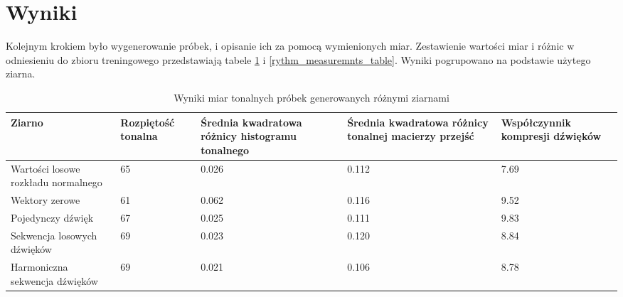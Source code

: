 {    \section{Wyniki}
    {
        Kolejnym krokiem było wygenerowanie próbek, i opisanie ich za pomocą wymienionych miar. Zestawienie wartości miar i różnic
        w odniesieniu do zbioru treningowego przedstawiają tabele \ref{tonal_measuremnts_table} i \ref{rythm_measuremnts_table}. Wyniki pogrupowano na podstawie użytego ziarna.

        \begin{table}
            \begin{center}
                \begin{tabular}{ |p{2.5cm}|p{2.5cm}|p{2.5cm}|p{2.5cm}|p{2.5cm}| }
                \hline
                Ziarno & Rozpiętość tonalna & Średnia kwadratowa różnicy histogramu tonalnego & Średnia kwadratowa różnicy tonalnej macierzy przejść & Współczynnik kompresji dźwięków \\ 
                \hline
                \hline
                Wartości losowe rozkładu normalnego & 65 & 0.026 & 0.112 & 7.69 \\  
                \hline
                Wektory zerowe & 61 & 0.062 & 0.116 & 9.52 \\
                \hline
                Pojedynczy dźwięk & 67 & 0.025 & 0.111 & 9.83 \\
                \hline
                Sekwencja losowych dźwięków & 69 & 0.023 & 0.120 & 8.84 \\
                \hline
                Harmoniczna sekwencja dźwięków & 69 & 0.021 & 0.106  & 8.78 \\
                \hline
                \end{tabular}
            \end{center}
            \caption{Wyniki miar tonalnych próbek generowanych różnymi ziarnami} \label{tonal_measuremnts_table}
        \end{table}
        
}}
